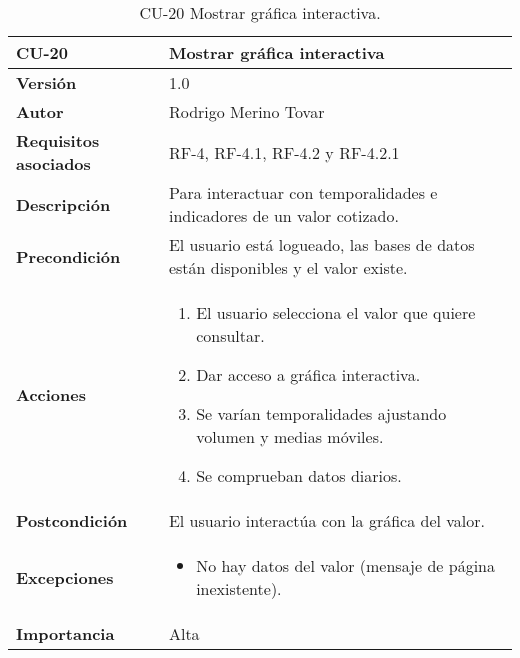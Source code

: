 \begin{table}[p]
	\centering
	\begin{tabularx}{\linewidth}{ p{} p{} }
		\toprule
		\textbf{CU-20}    & \textbf{Mostrar gráfica interactiva}\\
		\toprule
		\textbf{Versión}              & 1.0    \\
		\textbf{Autor}                & Rodrigo Merino Tovar \\
		\textbf{Requisitos asociados} & RF-4, RF-4.1, RF-4.2 y RF-4.2.1 \\
		\textbf{Descripción}          & Para interactuar con temporalidades e indicadores de un valor cotizado.\\
		\textbf{Precondición}         & El usuario está logueado, las bases de datos están disponibles y el valor existe.  \\
		\textbf{Acciones}             &
		\begin{enumerate}
			\def\labelenumi{\arabic{enumi}.}
			\tightlist 
			\item El usuario selecciona el valor que quiere consultar. 
			\item Dar acceso a gráfica interactiva.
			\item Se varían temporalidades ajustando volumen y medias móviles.
			\item Se comprueban datos diarios.
		\end{enumerate}\\
		\textbf{Postcondición}        & El usuario interactúa con la gráfica del valor. \\
		\textbf{Excepciones}          & 
		\begin{itemize}
			\tightlist
			\item No hay datos del valor (mensaje de página inexistente).
		\end{itemize} \\
		\textbf{Importancia}          & Alta \\
		\bottomrule
	\end{tabularx}
	\caption{CU-20 Mostrar gráfica interactiva.}
\end{table}



